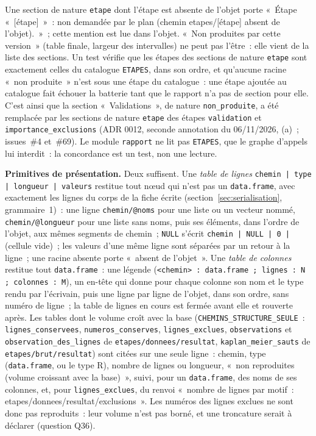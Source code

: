 \documentclass[a4paper,11pt]{article}
\newcommand{\code}[1]{\texttt{\small #1}}
\begin{document}
\noindent
Une section de nature \code{etape} dont l'étape est absente de l'objet porte
«~Étape «~[étape]~»~: non demandée par le plan (chemin etapes/[étape] absent
de l'objet).~»~; cette mention est lue dans l'objet. «~Non produites par
cette version~» (table finale, largeur des intervalles) ne peut
pas l'être~: elle vient de la liste des sections. Un test vérifie que les
étapes des sections de nature \code{etape} sont exactement celles du
catalogue \code{ETAPES}, dans son ordre, et qu'aucune racine «~non
produite~» n'est sous une étape du catalogue~: une étape ajoutée au
catalogue fait échouer la batterie tant que le rapport n'a pas de section
pour elle. C'est ainsi que la section «~Validations~», de nature
\code{non\_produite}, a été remplacée par les sections de nature
\code{etape} des étapes \code{validation} et \code{importance\_exclusions}
(ADR 0012, seconde annotation du 06/11/2026, (a)~; issues~\#4 et~\#69). Le module \code{rapport} ne lit pas \code{ETAPES},
que le graphe d'appels lui interdit~: la concordance est un test, non une
lecture.

\medskip
\noindent
\textbf{Primitives de présentation.} Deux suffisent. Une \emph{table de
lignes} \code{chemin | type | longueur | valeurs} restitue tout nœud qui
n'est pas un \code{data.frame}, avec exactement les lignes du corps de la
fiche écrite (section~\ref{sec:serialisation}, grammaire~1)~: une ligne
\code{chemin/@noms} pour une liste ou un vecteur nommé, \code{chemin/@longueur}
pour une liste sans noms, puis ses éléments, dans l'ordre de l'objet, aux
mêmes segments de chemin~; \code{NULL} s'écrit \code{chemin | NULL | 0 |}
(cellule vide)~; les valeurs d'une même ligne sont séparées par un retour à
la ligne~; une racine absente porte «~absent de l'objet~». Une \emph{table de
colonnes} restitue tout \code{data.frame}~: une légende
(\code{<chemin> : data.frame ; lignes : N ; colonnes : M}), un en-tête qui
donne pour chaque colonne son nom et le type rendu par l'écrivain, puis une
ligne par ligne de l'objet, dans son ordre, sans numéro de ligne~; la table
de lignes en cours est fermée avant elle et rouverte après. Les tables dont
le volume croît avec la base (\code{CHEMINS\_STRUCTURE\_SEULE}~:
\code{lignes\_conservees}, \code{numeros\_conserves}, \code{lignes\_exclues},
\code{observations} et \code{observation\_des\_lignes} de
\code{etapes/donnees/resultat}, \code{kaplan\_meier\_sauts} de
\code{etapes/brut/resultat}) sont citées sur une seule ligne~: chemin, type
(\code{data.frame}, ou le type R), nombre de lignes ou longueur, «~non
reproduites (volume croissant avec la base)~», suivi, pour un
\code{data.frame}, des noms de ses colonnes, et, pour
\code{lignes\_exclues}, du renvoi «~nombre de lignes par motif~:
etapes/donnees/resultat/exclusions~». Les numéros des lignes exclues ne sont
donc pas reproduits~: leur volume n'est pas borné, et une troncature serait
à déclarer (question Q36).
\end{document}
